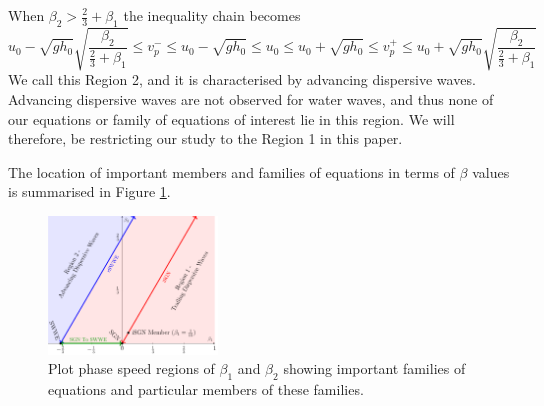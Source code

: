 \documentclass[10pt]{elsarticle}
\begin{document}
When ${\beta_2} > \frac{2}{3} + \beta_1 $ the inequality chain becomes
\begin{equation}
u_0 - \sqrt{gh_0} \sqrt{\dfrac{\beta_2}{\frac{2}{3} + \beta_1}} \le v^-_p \le u_0 -  \sqrt{gh_0} \le  u_0 \le u_0 + \sqrt{gh_0} \le   v^+_p  \le u_0 +  \sqrt{gh_0} \sqrt{\dfrac{\beta_2}{\frac{2}{3} + \beta_1}}
\end{equation}
We call this Region 2, and it is characterised by advancing dispersive waves. Advancing dispersive waves are not observed for water waves, and thus none of our equations or family of equations of interest lie in this region. We will therefore, be restricting our study to the Region 1 in this paper.  

The location of important members and families of equations in terms of $\beta$ values is summarised in Figure \ref{Fig:WaveSpeedReg}.

\begin{figure}
	\centering
	\includegraphics[width=0.4\textwidth]{./Figures/Explanation/BetaPlotAll.pdf}
	\caption{Plot phase speed regions of $\beta_1$ and $\beta_2$ showing important families of equations and particular members of these families.}
	\label{Fig:WaveSpeedReg}
\end{figure}



\end{document}
